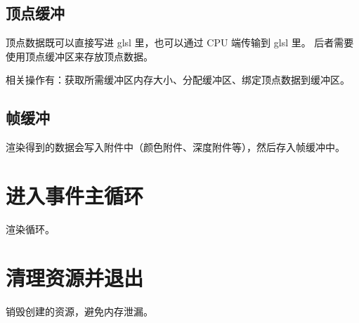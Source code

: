 \documentclass[a4paper, 12pt]{ctexart}
\begin{document}
\clearpage
\subsection{顶点缓冲}
    顶点数据既可以直接写进 glsl 里，也可以通过 CPU 端传输到 glsl 里。
    后者需要使用顶点缓冲区来存放顶点数据。

    相关操作有：获取所需缓冲区内存大小、分配缓冲区、绑定顶点数据到缓冲区。


\clearpage
\subsection{帧缓冲}
    渲染得到的数据会写入附件中（颜色附件、深度附件等），然后存入帧缓冲中。




\clearpage
\section{进入事件主循环}
    渲染循环。




\clearpage
\section{清理资源并退出}
    销毁创建的资源，避免内存泄漏。





\end{document}
